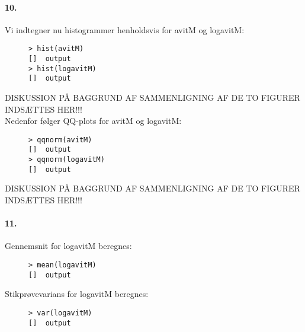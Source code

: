 \paragraph{10.}
Vi indtegner nu histogrammer henholdsvis for avitM og logavitM:

\begin{figure}[H]
\label{fig:anal4}
\begin{center}
\begin{verbatim}
> hist(avitM)
[]  output
> hist(logavitM)
[]  output
\end{verbatim}
\caption{}
\end{center}
\end{figure}

DISKUSSION PÅ BAGGRUND AF SAMMENLIGNING AF DE TO FIGURER INDSÆTTES 
HER!!! \\

Nedenfor følger QQ-plots for avitM og logavitM:

\begin{figure}[H]
\label{fig:anal5}
\begin{center}
\begin{verbatim}
> qqnorm(avitM)
[]  output
> qqnorm(logavitM)
[]  output
\end{verbatim}
\caption{}
\end{center}
\end{figure}

DISKUSSION PÅ BAGGRUND AF SAMMENLIGNING AF DE TO FIGURER INDSÆTTES 
HER!!!

\paragraph{11.} 
Gennemsnit for logavitM beregnes:

\begin{figure}[H]
\label{fig:anal6}
\begin{center}
\begin{verbatim}
> mean(logavitM)
[]  output
\end{verbatim}
\caption{}
\end{center}
\end{figure}

Stikprøvevarians for logavitM beregnes:

\begin{figure}[H]
\label{fig:anal7}
\begin{center}
\begin{verbatim}
> var(logavitM)
[]  output
\end{verbatim}
\caption{}
\end{center}
\end{figure}

